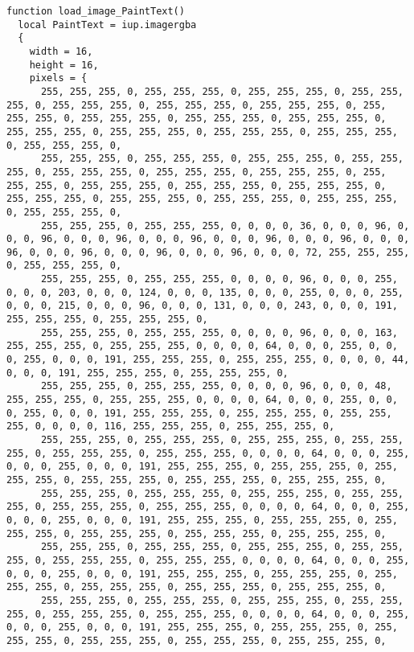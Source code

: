 \documentclass{ctexart}
\begin{document}
\begin{lstlisting}
function load_image_PaintText()
  local PaintText = iup.imagergba
  {
    width = 16,
    height = 16,
    pixels = {
      255, 255, 255, 0, 255, 255, 255, 0, 255, 255, 255, 0, 255, 255, 255, 0, 255, 255, 255, 0, 255, 255, 255, 0, 255, 255, 255, 0, 255, 255, 255, 0, 255, 255, 255, 0, 255, 255, 255, 0, 255, 255, 255, 0, 255, 255, 255, 0, 255, 255, 255, 0, 255, 255, 255, 0, 255, 255, 255, 0, 255, 255, 255, 0, 
      255, 255, 255, 0, 255, 255, 255, 0, 255, 255, 255, 0, 255, 255, 255, 0, 255, 255, 255, 0, 255, 255, 255, 0, 255, 255, 255, 0, 255, 255, 255, 0, 255, 255, 255, 0, 255, 255, 255, 0, 255, 255, 255, 0, 255, 255, 255, 0, 255, 255, 255, 0, 255, 255, 255, 0, 255, 255, 255, 0, 255, 255, 255, 0, 
      255, 255, 255, 0, 255, 255, 255, 0, 0, 0, 0, 36, 0, 0, 0, 96, 0, 0, 0, 96, 0, 0, 0, 96, 0, 0, 0, 96, 0, 0, 0, 96, 0, 0, 0, 96, 0, 0, 0, 96, 0, 0, 0, 96, 0, 0, 0, 96, 0, 0, 0, 96, 0, 0, 0, 72, 255, 255, 255, 0, 255, 255, 255, 0, 
      255, 255, 255, 0, 255, 255, 255, 0, 0, 0, 0, 96, 0, 0, 0, 255, 0, 0, 0, 203, 0, 0, 0, 124, 0, 0, 0, 135, 0, 0, 0, 255, 0, 0, 0, 255, 0, 0, 0, 215, 0, 0, 0, 96, 0, 0, 0, 131, 0, 0, 0, 243, 0, 0, 0, 191, 255, 255, 255, 0, 255, 255, 255, 0, 
      255, 255, 255, 0, 255, 255, 255, 0, 0, 0, 0, 96, 0, 0, 0, 163, 255, 255, 255, 0, 255, 255, 255, 0, 0, 0, 0, 64, 0, 0, 0, 255, 0, 0, 0, 255, 0, 0, 0, 191, 255, 255, 255, 0, 255, 255, 255, 0, 0, 0, 0, 44, 0, 0, 0, 191, 255, 255, 255, 0, 255, 255, 255, 0, 
      255, 255, 255, 0, 255, 255, 255, 0, 0, 0, 0, 96, 0, 0, 0, 48, 255, 255, 255, 0, 255, 255, 255, 0, 0, 0, 0, 64, 0, 0, 0, 255, 0, 0, 0, 255, 0, 0, 0, 191, 255, 255, 255, 0, 255, 255, 255, 0, 255, 255, 255, 0, 0, 0, 0, 116, 255, 255, 255, 0, 255, 255, 255, 0, 
      255, 255, 255, 0, 255, 255, 255, 0, 255, 255, 255, 0, 255, 255, 255, 0, 255, 255, 255, 0, 255, 255, 255, 0, 0, 0, 0, 64, 0, 0, 0, 255, 0, 0, 0, 255, 0, 0, 0, 191, 255, 255, 255, 0, 255, 255, 255, 0, 255, 255, 255, 0, 255, 255, 255, 0, 255, 255, 255, 0, 255, 255, 255, 0, 
      255, 255, 255, 0, 255, 255, 255, 0, 255, 255, 255, 0, 255, 255, 255, 0, 255, 255, 255, 0, 255, 255, 255, 0, 0, 0, 0, 64, 0, 0, 0, 255, 0, 0, 0, 255, 0, 0, 0, 191, 255, 255, 255, 0, 255, 255, 255, 0, 255, 255, 255, 0, 255, 255, 255, 0, 255, 255, 255, 0, 255, 255, 255, 0, 
      255, 255, 255, 0, 255, 255, 255, 0, 255, 255, 255, 0, 255, 255, 255, 0, 255, 255, 255, 0, 255, 255, 255, 0, 0, 0, 0, 64, 0, 0, 0, 255, 0, 0, 0, 255, 0, 0, 0, 191, 255, 255, 255, 0, 255, 255, 255, 0, 255, 255, 255, 0, 255, 255, 255, 0, 255, 255, 255, 0, 255, 255, 255, 0, 
      255, 255, 255, 0, 255, 255, 255, 0, 255, 255, 255, 0, 255, 255, 255, 0, 255, 255, 255, 0, 255, 255, 255, 0, 0, 0, 0, 64, 0, 0, 0, 255, 0, 0, 0, 255, 0, 0, 0, 191, 255, 255, 255, 0, 255, 255, 255, 0, 255, 255, 255, 0, 255, 255, 255, 0, 255, 255, 255, 0, 255, 255, 255, 0, 

\end{lstlisting}
\end{document}
